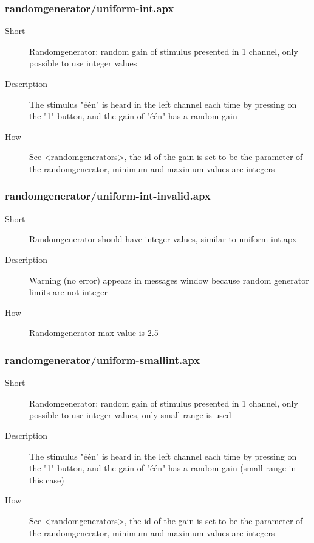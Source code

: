 \subsubsection{randomgenerator/uniform-int.apx}
\begin{description}
\item[Short] 
 Randomgenerator: random gain of stimulus presented in 1 channel, only possible to use integer values
\item[Description] 
 The stimulus "één" is heard in the left channel each time by pressing on the "1" button, and the gain of "één" has a random gain
\item[How] 
 See \textless{}randomgenerators\textgreater{}, the id of the gain is set to be the parameter of the randomgenerator, minimum and maximum values are integers
\end{description}

\subsubsection{randomgenerator/uniform-int-invalid.apx}
\begin{description}
\item[Short] 
 Randomgenerator should have integer values, similar to uniform-int.apx
\item[Description] 
 Warning (no error) appears in messages window because random generator limits are not integer
\item[How] 
 Randomgenerator max value is 2.5
\end{description}

\subsubsection{randomgenerator/uniform-smallint.apx}
\begin{description}
\item[Short] 
 Randomgenerator: random gain of stimulus presented in 1 channel, only possible to use integer values, only small range is used
\item[Description] 
 The stimulus "één" is heard in the left channel each time by pressing on the "1" button, and the gain of "één" has a random gain (small range in this case)
\item[How] 
 See \textless{}randomgenerators\textgreater{}, the id of the gain is set to be the parameter of the randomgenerator, minimum and maximum values are integers
\end{description}

